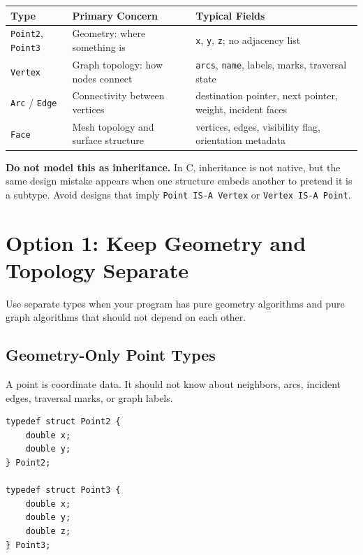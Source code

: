 \documentclass[11pt]{article}
\begin{document}
\begin{center}
\begin{tabularx}{\textwidth}{>{\raggedright\arraybackslash}p{} >{\raggedright\arraybackslash}X >{\raggedright\arraybackslash}X}
\toprule
\textbf{Type} & \textbf{Primary Concern} & \textbf{Typical Fields} \\
\midrule
\texttt{Point2}, \texttt{Point3} & Geometry: where something is & \texttt{x}, \texttt{y}, \texttt{z}; no adjacency list \\
\texttt{Vertex} & Graph topology: how nodes connect & \texttt{arcs}, \texttt{name}, labels, marks, traversal state \\
\texttt{Arc} / \texttt{Edge} & Connectivity between vertices & destination pointer, next pointer, weight, incident faces \\
\texttt{Face} & Mesh topology and surface structure & vertices, edges, visibility flag, orientation metadata \\
\bottomrule
\end{tabularx}
\end{center}

\begin{warningbox}
\textbf{Do not model this as inheritance.} In C, inheritance is not native, but the same design mistake appears when one structure embeds another to pretend it is a subtype. Avoid designs that imply \texttt{Point IS-A Vertex} or \texttt{Vertex IS-A Point}.
\end{warningbox}

\section{Option 1: Keep Geometry and Topology Separate}

Use separate types when your program has pure geometry algorithms and pure graph algorithms that should not depend on each other.

\subsection{Geometry-Only Point Types}

A point is coordinate data. It should not know about neighbors, arcs, incident edges, traversal marks, or graph labels.

\begin{verbatim}
typedef struct Point2 {
    double x;
    double y;
} Point2;

typedef struct Point3 {
    double x;
    double y;
    double z;
} Point3;
\end{verbatim}
\end{document}
